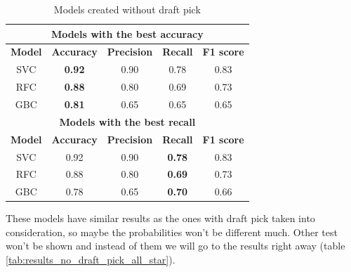 \documentclass[a4paper]{article}
\begin{document}
\begin{table}[!h]
\begin{center}
\begin{tabular}{|c|c|c|c|c|} \hline
\multicolumn{5}{|c|}{\textbf{Models with the best accuracy}} \\ \hline
\textbf{Model} & \textbf{Accuracy} & \textbf{Precision} & \textbf{Recall} & \textbf{F1 score} \\ \hline
SVC & \textbf{0.92} & 0.90 & 0.78 & 0.83 \\ \hline
RFC & \textbf{0.88} & 0.80 & 0.69 & 0.73 \\ \hline
GBC & \textbf{0.81} & 0.65 & 0.65 & 0.65 \\ \hline
\multicolumn{5}{|c|}{\textbf{Models with the best recall}} \\ \hline
\textbf{Model} & \textbf{Accuracy} & \textbf{Precision} & \textbf{Recall} & \textbf{F1 score} \\ \hline
SVC & 0.92 & 0.90 & \textbf{0.78} & 0.83 \\ \hline
RFC & 0.88 & 0.80 & \textbf{0.69} & 0.73 \\ \hline
GBC & 0.78 & 0.65 & \textbf{0.70} & 0.66 \\ \hline
\end{tabular}
\caption{Models created without draft pick}
\label{tab:models_no_draft_pick_all_star}
\end{center}
\end{table}

These models have similar results as the ones with draft pick taken into consideration, so maybe the probabilities won't be different much. Other test won't be shown and instead of them we will go to the results right away (table \ref{tab:results_no_draft_pick_all_star}).
\end{document}
